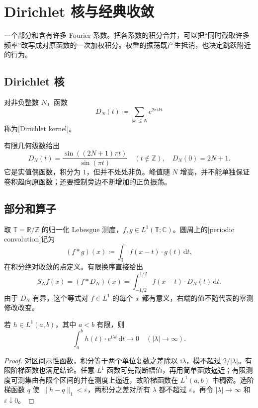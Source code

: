 \section{Dirichlet 核与经典收敛}
\label{b2:sec:0202}

一个部分和含有许多 Fourier 系数。把各系数的积分合并，可以把“同时截取许多频率”改写成对原函数的一次加权积分。权重的振荡既产生抵消，也决定跳跃附近的行为。

\subsection{Dirichlet 核}
\label{b2:subsec:020201}

\begin{definition}\label{b2:def:02-dirichlet-kernel}
对非负整数 \(N\)，函数
\[
 D_N(t)\coloneqq\sum_{|k|\leq N}e^{2\pi\mathrm{i}kt}
\]
称为[Dirichlet kernel]。
\end{definition}

有限几何级数给出
\[
 D_N(t)=\dfrac{\sin((2N+1)\pi t)}{\sin(\pi t)}\quad(t\notin\mathbb Z),
 \quad D_N(0)=2N+1.
\]
它是实值偶函数，积分为 \(1\)，但并不处处非负。峰值随 \(N\) 增高，并不能单独保证卷积趋向原函数；还要控制旁边不断增加的正负振荡。

\subsection{部分和算子}
\label{b2:subsec:020202}

取 \(\mathbb T=\mathbb R/\mathbb Z\) 的归一化 Lebesgue 测度，\(f,g\in L^1(\mathbb T;\mathbb C)\)。圆周上的[periodic convolution]记为
\[
 (f*g)(x)\coloneqq\int_{\mathbb T}f(x-t)\cdot g(t)\,\mathrm{d}t,
\]
在积分绝对收敛的点定义。有限换序直接给出
\begin{equation}\label{b2:eq:02-dirichlet-convolution}
 S_Nf(x)=(f*D_N)(x)
 =\int_{-1/2}^{1/2}f(x-t)\cdot D_N(t)\,\mathrm{d}t.
\end{equation}
由于 \(D_N\) 有界，这个等式对 \(f\in L^1\) 的每个 \(x\) 都有意义，右端的值不随代表的零测修改改变。

\begin{lemma}[振荡积分趋零]\label{b2:lem:02-oscillation}
若 \(h\in L^1(a,b)\)，其中 \(a<b\) 有限，则
\[
 \int_a^b h(t)\cdot e^{\mathrm{i}\lambda t}\,\mathrm{d}t\longrightarrow0
 \quad(|\lambda|\to\infty).
\]
\end{lemma}
\begin{proof}
对区间示性函数，积分等于两个单位复数之差除以 \(\mathrm{i}\lambda\)，模不超过 \(2/|\lambda|\)。有限阶梯函数也满足结论。任意 \(L^1\) 函数可先截断幅值，再用简单函数逼近；有限测度可测集由有限个区间的并在测度上逼近，故阶梯函数在 \(L^1(a,b)\) 中稠密。选阶梯函数 \(q\) 使 \(\|h-q\|_1<\varepsilon\)，两积分之差对所有 \(\lambda\) 都不超过 \(\varepsilon\)，再令 \(|\lambda|\to\infty\) 和 \(\varepsilon\downarrow0\)。
\end{proof}

